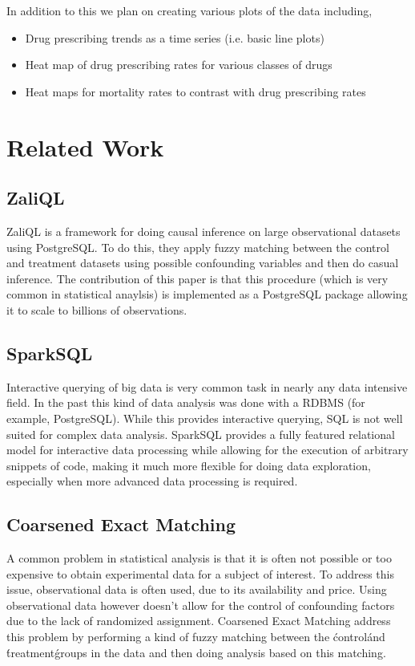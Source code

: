 \documentclass[a4paper]{article}
\begin{document}
	In addition to this we plan on creating various plots of the data including,
	\begin{itemize}
		\item Drug prescribing trends as a time series (i.e. basic line plots)
		\item Heat map of drug prescribing rates for various classes of drugs
		\item Heat maps for mortality rates to contrast with drug prescribing rates
	\end{itemize}


\section{Related Work}
	\subsection{ZaliQL~\cite{ref:ZaliQL}}
		ZaliQL is a framework for doing causal inference on large observational datasets using PostgreSQL. To do this, they 
		apply fuzzy matching between the control and treatment datasets using possible confounding variables 
		and then do casual inference. The contribution of this paper is that this procedure (which is very common in statistical anaylsis)
		is implemented as a PostgreSQL package allowing it to scale to billions of observations.

	\subsection{SparkSQL~\cite{ref:SparkSQL}}
		Interactive querying of big data is very common task in nearly any data intensive field. In the past
		this kind of data analysis was done with a RDBMS (for example, PostgreSQL). While this provides 
		interactive querying, SQL is not well suited for complex data analysis. 
		SparkSQL provides a fully featured relational model for interactive data processing while allowing for 
		the execution of arbitrary snippets of code, making it much more flexible for doing data exploration, especially 
		when more advanced data processing is required.
	
	\subsection{Coarsened Exact Matching ~\cite{ref:CEM}}
		A common problem in statistical analysis is that it is often not possible or too expensive 
		to obtain experimental data for a subject of interest. To address this issue, observational data is
		often used, due to its availability and price. Using observational data however doesn't allow for 
		the control of confounding factors due to the lack of randomized assignment. Coarsened Exact Matching
		address this problem by performing a kind of fuzzy matching between the \'control\' and \'treatment\' 
		groups in the data and then doing analysis based on this matching. 
	
	

\printbibliography
\end{document}
